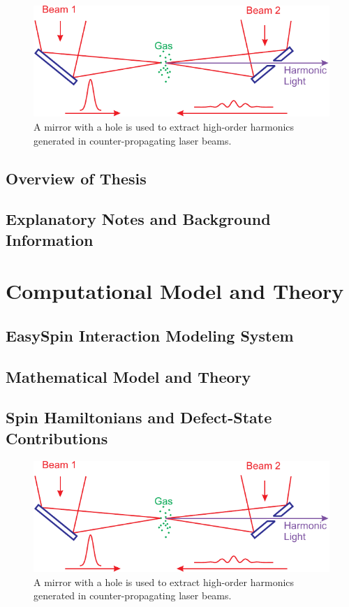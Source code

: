 \documentclass[oneside, astronomy, noacknowlegments]{BYUPhys}
\begin{document}
\begin{figure}
    \centerline{\includegraphics{Graphic1}}
    \caption[Magnetic field and microwave frequency relationship]{\label{fig:MFRelationship}
     A mirror with a hole is used to extract high-order harmonics generated in
     counter-propagating laser beams.}
 \end{figure}

\section{Overview of Thesis}
\section{Explanatory Notes and Background Information}

\chapter{Computational Model and Theory}
\section{EasySpin Interaction Modeling System}
\section{Mathematical Model and Theory}
\section{Spin Hamiltonians and Defect-State Contributions}

\begin{figure}
    \centerline{\includegraphics{Graphic1}}
    \caption[Example of spin-hamiltonion fields]{\label{fig:HamFields}
     A mirror with a hole is used to extract high-order harmonics generated in
     counter-propagating laser beams.}
 \end{figure}
\end{document}
